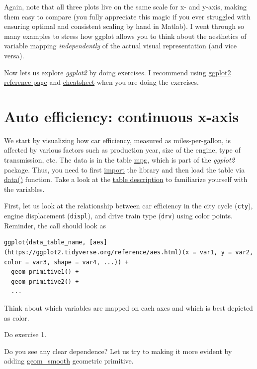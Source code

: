 \documentclass[
]{book}
\begin{document}
Again, note that all three plots live on the same scale for x- and y-axis, making them easy to compare (you fully appreciate this magic if you ever struggled with ensuring optimal and consistent scaling by hand in Matlab). I went through so many examples to stress how ggplot allows you to think about the aesthetics of variable mapping \emph{independently} of the actual visual representation (and vice versa).

Now lets us explore \emph{ggplot2} by doing exercises. I recommend using \href{https://ggplot2.tidyverse.org/}{ggplot2 reference page} and \href{https://github.com/rstudio/cheatsheets/raw/master/data-visualization-2.1.pdf}{cheatsheet} when you are doing the exercises.

\hypertarget{auto-efficiency-continuous-x-axis}{%
\section{Auto efficiency: continuous x-axis}\label{auto-efficiency-continuous-x-axis}}

We start by visualizing how car efficiency, measured as miles-per-gallon, is affected by various factors such as production year, size of the engine, type of transmission, etc. The data is in the table \href{https://ggplot2.tidyverse.org/reference/mpg.html}{mpg}, which is part of the \emph{ggplot2} package. Thus, you need to first \protect\hyperlink{library}{import} the library and then load the table via \protect\hyperlink{data}{data()} function. Take a look at the \href{https://ggplot2.tidyverse.org/reference/mpg.html}{table description} to familiarize yourself with the variables.

First, let us look at the relationship between car efficiency in the city cycle (\texttt{cty}), engine displacement (\texttt{displ}), and drive train type (\texttt{drv}) using color points. Reminder, the call should look as

\begin{verbatim}
ggplot(data_table_name, [aes](https://ggplot2.tidyverse.org/reference/aes.html)(x = var1, y = var2, color = var3, shape = var4, ...)) + 
  geom_primitive1() + 
  geom_primitive2() +
  ...
\end{verbatim}

Think about which variables are mapped on each axes and which is best depicted as color.

Do exercise 1.

Do you see any clear dependence? Let us try to making it more evident by adding \href{https://ggplot2.tidyverse.org/reference/geom_smooth.html}{geom\_smooth} geometric primitive.
\end{document}
